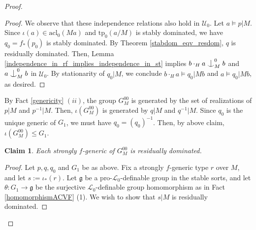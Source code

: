 \documentclass[12pt]{article}
\newcommand{\tpp}{\mathrm{tp}}
\newcommand{\acl}{\mathrm{acl}}
\newcommand{\0}{\emptyset}
\newcommand{\Ualg}{\mathcal{U}_0}
\def\forkindep{\mathrel{\raise0.2ex\hbox{\ooalign{\hidewidth$\vert$\hidewidth\cr\raise-0.9ex\hbox{$\smile$}}}}}
\theoremstyle{plain}%
\newtheorem{claim}{Claim}
\theoremstyle{definition}
\theoremstyle{remark}
\begin{document}
\begin{proof}
\begin{proof}
We observe that these independence relations also hold in $\Ualg$. Let $a\models p|M$. Since $\iota(a)\in \acl_0(Ma)$ and $\tpp_0(a/M)$ is stably dominated, we have $q_0=f_{*}(p_0)$ is stably dominated. By Theorem \ref{stabdom_eqv_resdom}, $q$ is residually dominated. Then, Lemma \ref{independence_in_rf_implies_independence_in_st} implies $b\cdot_H a \forkindep_M^0 b$ and $a\forkindep_M^0 b$ in $\Ualg$. By stationarity of $q_0|M$, we conclude $b\cdot_H a \models q_0|Mb$ and $a \models q_0|Mb$, as desired. \end{proof}   



By Fact \ref{genericity} $(ii)$, the group $G_M^{00}$ is generated by the set of realizations of $p|M$ and $p^{-1}|M$. Then, $\iota(G_M^{00})$ is generated by $q|M$ and $q^{-1}|M$. Since $q_0$ is the unique generic of $G_1$, we must have $q_0=(q_0)^{-1}$. Then, by above claim, $\iota(G_M^{00}) \leq G_1$.
\begin{claim}\label{claim2_homres}
        Each strongly $f$-generic of $G_M^{00}$ is residually dominated.
\end{claim}

   \begin{proof} Let $p,q,q_0$ and $G_1$ be as above. Fix a strongly $f$-generic type $r$ over $M$, and let $s := \iota_*(r)$. %
   Let $\mathfrak{g}$ be a pro-$\mathcal{L}_0$-definable group in the stable sorts, and let $\theta: G_1 \to \mathfrak{g}$ be the surjective $\mathcal{L}_0$-definable group homomorphism as in Fact \ref{homomorphismACVF} (1). We wish to show that $s|M$ is residually dominated.
   

\end{proof}
\end{proof}
\end{document}
